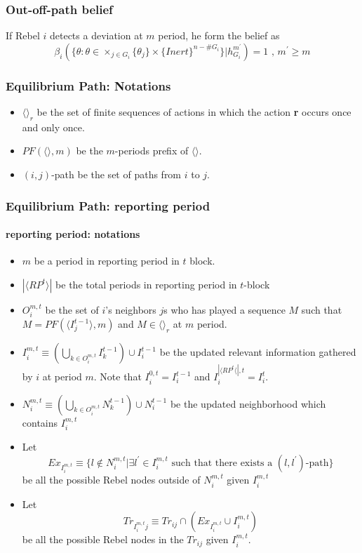 \documentclass[12pt,letter]{article}
\theoremstyle{definition}
\theoremstyle{remark}
\theoremstyle{claim}
\begin{document}
\subsubsection{Out-off-path belief}

If Rebel $i$ detects a deviation at $m$ period, he form the belief as
\begin{equation}
\beta_{i}(\{\theta:\theta\in \times_{j\in G_i}\{\theta_j\}\times\{Inert\}^{n-\#G_i}\}|h^{m^{'}}_{G_i})=1 \text{ , } m^{'}\geq m
\end{equation}



\subsubsection{Equilibrium Path: Notations}


\begin{itemize}

\item $\langle \rangle_r$ be the set of finite sequences of actions in which the action \textbf{r} occurs once and only once.
\item $PF(\langle \rangle,m)$ be the $m$-periods prefix of $\langle \rangle$.
\item $(i,j)$-path be the set of paths from $i$ to $j$.

\end{itemize}

\subsubsection{Equilibrium Path: reporting period}

\paragraph{reporting period: notations}
\begin{itemize}
\item $m$ be a period in reporting period in $t$ block.
\item $|\langle RP^t \rangle|$ be the total periods in reporting period in $t$-block
\item $O^{m,t}_i$ be the set of $i$'s neighbors $j$s who has played a sequence $M$ such that $M=PF(\langle I^{t-1}_j \rangle,m)$ and $M \in \langle \rangle_r$ at $m$ period. 
\item $I^{m,t}_i\equiv (\bigcup_{k\in O^{m,t}_i} I^{t-1}_k)\cup I^{t-1}_i$ be the updated relevant information gathered by $i$ at period $m$. Note that $I^{0,t}_i=I^{t-1}_i$ and $I^{|\langle RP^t \langle|,t }_i=I^{t}_i$.
\item $N^{m,t}_i\equiv (\bigcup_{k\in O^{m,t}_i} N^{t-1}_k)\cup N^{t-1}_i$
be the updated neighborhood which contains $I^{m,t}_i$

\item Let 
\[Ex_{I^{m,t}_i}\equiv \{l\notin N^{m,t}_i|\exists l^{'}\in I^{m,t}_i\text{ such that there exists a $(l,l^{'})$-path}\}\]
be all the possible Rebel nodes outside of $N^{m,t}_i$ given $I^{m,t}_i$
\item Let
\[Tr_{I^{m,t}_ij}\equiv Tr_{ij}\cap (Ex_{I^{m,t}_i}\cup I^{m,t}_i)\]
be all the possible Rebel nodes in the $Tr_{ij}$ given $I^{m,t}_i$. 
\end{itemize}
\end{document}
